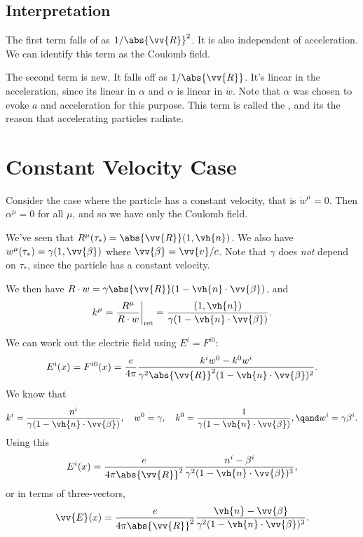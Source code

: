 \documentclass[fleqn]{NotesClass}
\newcommand*{\ret}{{\text{ret}}}
\begin{document}
    \subsection{Interpretation}
    The first term falls of as \(1 / \abs{\vv{R}}^2\).
    It is also independent of acceleration.
    We can identify this term as the Coulomb field.
    
    The second term is new.
    It falls off as \(1/\abs{\vv{R}}\).
    It's linear in the acceleration, since its linear in \(\alpha\) and \(\alpha\) is linear in \(\dot{w}\).
    Note that \(\alpha\) was chosen to evoke \(a\) and acceleration for this purpose.
    This term is called the , and its the reason that accelerating particles radiate.
    
    \section{Constant Velocity Case}
    \label{sec:constant velocity case}
    Consider the case where the particle has a constant velocity, that is \(\dot{w}^\mu = 0\).
    Then \(\alpha^\mu = 0\) for all \(\mu\), and so we have only the Coulomb field.
    
    We've seen that \(R^\mu(\tau_*) = \abs{\vv{R}}(1, \vh{n})\).
    We also have \(w^\mu(\tau_*) = \gamma(1, \vv{\beta})\) where \(\vv{\beta} = \vv{v}/c\).
    Note that \(\gamma\) does \emph{not} depend on \(\tau_*\), since the particle has a constant velocity.
    
    We then have \(R \cdot w = \gamma\abs{\vv{R}}(1 - \vh{n} \cdot \vv{\beta})\), and
    \begin{equation}
        k^\mu = \frac{R^\mu}{R \cdot w} \bigg|_{\ret} = \frac{(1, \vh{n})}{\gamma(1 - \vh{n}\cdot\vv{\beta})}.
    \end{equation}

    We can work out the electric field using \(E^i = F^{i0}\):
    \begin{equation}
        E^i(x) = F^{i0}(x) = \frac{e}{4\pi} \frac{k^i w^0 - k^0 w^i}{\gamma^2 \abs{\vv{R}}^2(1 - \vh{n} \cdot \vv{\beta})^2}.
    \end{equation}
    We know that
    \begin{equation}
        k^i = \frac{n^i}{\gamma(1 - \vh{n} \cdot \vv{\beta})}, \quad w^0 = \gamma, \quad k^0 = \frac{1}{\gamma(1 - \vh{n} \cdot \vv{\beta})}, \qand w^i = \gamma \beta^i.
    \end{equation}
    Using this
    \begin{equation}
        E^i(x) = \frac{e}{4\pi \abs{\vv{R}}^2} \frac{n^i - \beta^i}{\gamma^2(1 - \vh{n} \cdot \vv{\beta})^3},
    \end{equation}
    or in terms of three-vectors,
    \begin{equation}
        \vv{E}(x) = \frac{e}{4\pi\abs{\vv{R}}^2} \frac{\vh{n} - \vv{\beta}}{\gamma^2(1 - \vh{n}\cdot \vv{\beta})^3}.
    \end{equation}
    
\end{document}
